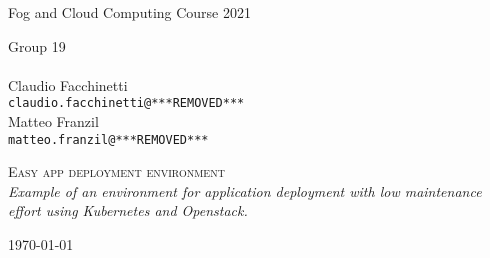 \pagestyle{plain}

\thispagestyle{empty}

\begin{center}
  \begin{figure}[h!]
    \centerline{}
  \end{figure}

  \vspace{0.7 cm}

  \LARGE{Fog and Cloud Computing Course 2021\\}

  \vspace{1 cm}
  \Large{
    Group 19 \\
    \hphantom{abcdefg} \\
    Claudio Facchinetti \\
    \texttt{claudio.facchinetti@***REMOVED***}\\
    Matteo Franzil\\
    \texttt{matteo.franzil@***REMOVED***}
  }

  \vspace{3 cm}
  \Huge\textsc{Easy app deployment environment\\}
  \Large{\it{Example of an environment for application deployment with low maintenance effort using Kubernetes and Openstack.}}

  \vspace{8 cm}

  \Large{\today}

\end{center}